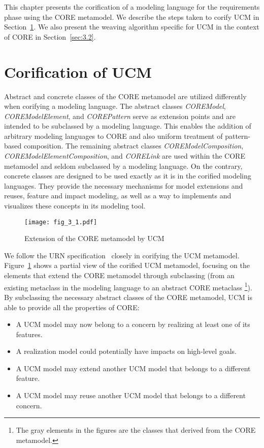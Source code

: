 This chapter presents the corification of a modeling language for the requirements phase using the CORE metamodel. We describe the steps taken to corify UCM in Section~\ref{sec:3.1}. We also present the weaving algorithm specific for UCM in the context of CORE in Section~\ref{sec:3.2}.

\section{Corification of UCM} \label{sec:3.1}

Abstract and concrete classes of the CORE metamodel are utilized differently when corifying a modeling language. The abstract classes \textit{\cls COREModel}, \textit{\cls COREModelElement}, and \textit{\cls COREPattern} serve as extension points and are intended to be subclassed by a modeling language. This enables the addition of arbitrary modeling languages to CORE and also uniform treatment of pattern-based composition. The remaining abstract classes \textit{\cls COREModelComposition}, \textit{\cls COREModelElementComposition}, and \textit{\cls CORELink} are used within the CORE metamodel and seldom subclassed by a modeling language. On the contrary, concrete classes are designed to be used exactly as it is in the corified modeling languages. They provide the necessary mechanisms for model extensions and reuses, feature and impact modeling, as well as a way to implements and visualizes these concepts in its modeling tool.

\begin{figure}
	\centering
	\texttt{[image: fig\_3\_1.pdf]}
	\caption{Extension of the CORE metamodel by UCM}
	\label{fig:3.1}
\end{figure}

We follow the URN specification~\cite{itu2012151} closely in corifying the UCM metamodel. Figure~\ref{fig:3.1} shows a partial view of the corified UCM metamodel, focusing on the elements that extend the CORE metamodel through subclassing (from an existing metaclass in the modeling language to an abstract CORE metaclass \footnote{The gray elements in the figures are the classes that derived from the CORE metamodel.}). By subclassing the necessary abstract classes of the CORE metamodel, UCM is able to provide all the properties of CORE:

\begin{itemize}
	\setlength{\parskip}{0pt} \setlength{\itemsep}{0pt}
	\item A UCM model may now belong to a concern by realizing at least one of its features.
	\item A realization model could potentially have impacts on high-level goals.
	\item A UCM model may extend another UCM model that belongs to a different feature.
	\item A UCM model may reuse another UCM model that belongs to a different concern.
\end{itemize}

